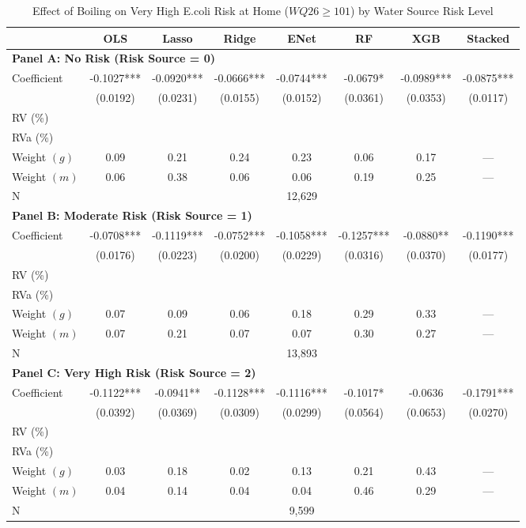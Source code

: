 \begin{table}[htbp]
\centering
\caption{Effect of Boiling on Very High E.coli Risk at Home ($WQ26\geq101$) by Water Source Risk Level}
\label{tab:very_high_risk_home_subgroups}
\begin{tabular}{lccccccc}
\toprule
 & OLS & Lasso & Ridge & ENet & RF & XGB & Stacked \\
\midrule
\multicolumn{8}{l}{\textbf{Panel A: No Risk (Risk Source = 0)}} \\
\midrule
Coefficient & -0.1027*** & -0.0920*** & -0.0666*** & -0.0744*** & -0.0679* & -0.0989*** & -0.0875*** \\
 & (0.0192) & (0.0231) & (0.0155) & (0.0152) & (0.0361) & (0.0353) & (0.0117) \\
RV (\%) \\
RVa (\%) \\
Weight $(g)$ & 0.09 & 0.21 & 0.24 & 0.23 & 0.06 & 0.17 & — \\
Weight $(m)$ & 0.06 & 0.38 & 0.06 & 0.06 & 0.19 & 0.25 & — \\
N & \multicolumn{7}{c}{12,629} \\

\multicolumn{8}{l}{\textbf{Panel B: Moderate Risk (Risk Source = 1)}} \\
\midrule
Coefficient & -0.0708*** & -0.1119*** & -0.0752*** & -0.1058*** & -0.1257*** & -0.0880** & -0.1190*** \\
 & (0.0176) & (0.0223) & (0.0200) & (0.0229) & (0.0316) & (0.0370) & (0.0177) \\
RV (\%) \\
RVa (\%) \\
Weight $(g)$ & 0.07 & 0.09 & 0.06 & 0.18 & 0.29 & 0.33 & — \\
Weight $(m)$ & 0.07 & 0.21 & 0.07 & 0.07 & 0.30 & 0.27 & — \\
N & \multicolumn{7}{c}{13,893} \\

\multicolumn{8}{l}{\textbf{Panel C: Very High Risk (Risk Source = 2)}} \\
\midrule
Coefficient & -0.1122*** & -0.0941** & -0.1128*** & -0.1116*** & -0.1017* & -0.0636 & -0.1791*** \\
 & (0.0392) & (0.0369) & (0.0309) & (0.0299) & (0.0564) & (0.0653) & (0.0270) \\
RV (\%) \\
RVa (\%) \\
Weight $(g)$ & 0.03 & 0.18 & 0.02 & 0.13 & 0.21 & 0.43 & — \\
Weight $(m)$ & 0.04 & 0.14 & 0.04 & 0.04 & 0.46 & 0.29 & — \\
N & \multicolumn{7}{c}{9,599} \\


\end{tabular}
\end{table}
